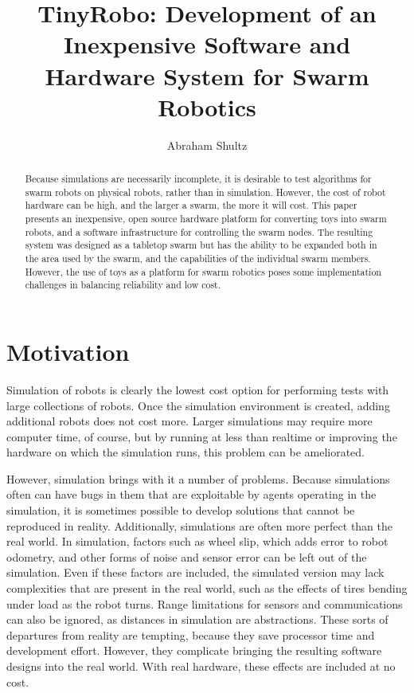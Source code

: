 \documentclass[]{article}
\title{TinyRobo: Development of an Inexpensive Software and Hardware System for Swarm Robotics}
\author{Abraham Shultz}
\begin{document}
\maketitle

\begin{abstract}
Because simulations are necessarily incomplete, it is desirable to test algorithms for swarm robots on physical robots, rather than in simulation. 
However, the cost of robot hardware can be high, and the larger a swarm, the more it will cost. 
This paper presents an inexpensive, open source hardware platform for converting toys into swarm robots, and a software infrastructure for controlling the swarm nodes. 
The resulting system was designed as a tabletop swarm but has the ability to be expanded both in the area used by the swarm, and the capabilities of the individual swarm members. 
However, the use of toys as a platform for swarm robotics poses some implementation challenges in balancing reliability and low cost. 

\end{abstract}

\section{Motivation}

Simulation of robots is clearly the lowest cost option for performing tests with large collections of robots. 
Once the simulation environment is created, adding additional robots does not cost more. 
Larger simulations may require more computer time, of course, but by running at less than realtime or improving the hardware on which the simulation runs, this problem can be ameliorated. 

However, simulation brings with it a number of problems. 
Because simulations often can have bugs in them that are exploitable by agents operating in the simulation, it is sometimes possible to develop solutions that cannot be reproduced in reality. 
Additionally, simulations are often more perfect than the real world. 
In simulation, factors such as wheel slip, which adds error to robot odometry, and other forms of noise and sensor error can be left out of the simulation. 
Even if these factors are included, the simulated version may lack complexities that are present in the real world, such as the effects of tires bending under load as the robot turns. 
Range limitations for sensors and communications can also be ignored, as distances in simulation are abstractions. 
These sorts of departures from reality are tempting, because they save processor time and development effort.
However, they complicate bringing the resulting software designs into the real world.  
With real hardware, these effects are included at no cost. 
\end{document}
